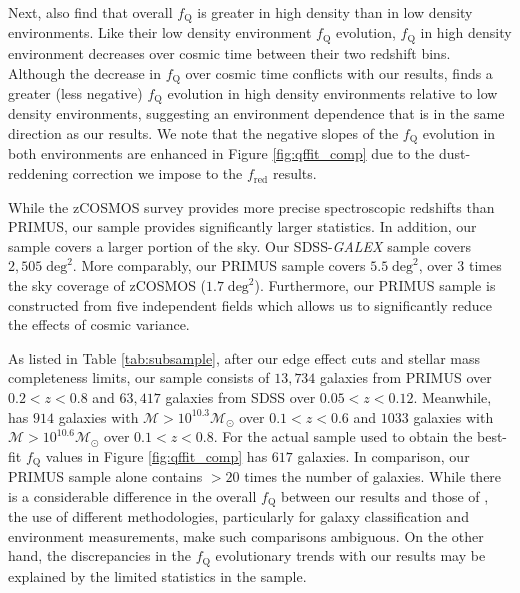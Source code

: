 \documentclass{aastex}
\begin{document}
Next, \cite{Kovac:2014aa} also find that overall $f_{\mathrm{Q}}$ is
greater in high density than in low density environments. Like their
low density environment $f_{\mathrm{Q}}$ evolution, $f_{\mathrm{Q}}$ in high
density environment decreases over cosmic time between their two
redshift bins. Although the decrease in $f_{\mathrm{Q}}$ over cosmic time
conflicts with our results, \cite{Kovac:2014aa} finds a greater (less
negative) $f_{\mathrm{Q}}$ evolution in high density environments relative
to low density environments, suggesting an environment dependence that
is in the same direction as our results. We note that the negative
slopes of the $f_{\mathrm{Q}}$ evolution in both environments are enhanced
in Figure \ref{fig:qffit_comp} due to the dust-reddening
correction we impose to the \cite{Kovac:2014aa} $f_{\mathrm{red}}$ results. 


While the zCOSMOS survey provides more precise spectroscopic redshifts than PRIMUS, our sample provides significantly larger statistics. In addition, our sample covers a larger portion of the sky. Our SDSS-{\em GALEX} sample covers $2,505 \;\mathrm{deg}^2$. More comparably, our PRIMUS sample covers $5.5 \;\mathrm{deg}^2$, over 3 times the sky coverage of zCOSMOS ($1.7 \;\mathrm{deg}^2$). Furthermore, our PRIMUS sample is constructed from five independent fields which allows us to significantly reduce the effects of cosmic variance. 

As listed in Table \ref{tab:subsample}, after our edge effect cuts and
stellar mass completeness limits, our sample consists of $13,734$
galaxies from PRIMUS over $0.2< z< 0.8$ and $63,417$ galaxies from
SDSS over $0.05 < z < 0.12$. Meanwhile, \cite{Iovino:2010aa} has $914$
galaxies with $\mathcal{M} > 10^{10.3} \mathcal{M}_{\odot}$ over $0.1
< z < 0.6$ and $1033$ galaxies with $\mathcal{M} > 10^{10.6}
\mathcal{M}_{\odot}$ over $0.1 < z < 0.8$. For the actual sample used
to obtain the best-fit $f_{\mathrm{Q}}$ values in Figure
\ref{fig:qffit_comp} \cite{Iovino:2010aa} has $617$ galaxies. In
comparison, our PRIMUS sample alone contains $> 20$ times the number
of galaxies. While there is a considerable difference in the overall
$f_{\mathrm{Q}}$ between our results and those of \cite{Iovino:2010aa},
the use of different methodologies, particularly for galaxy
classification and environment measurements, make such comparisons
ambiguous. On the other hand, the discrepancies in the $f_{\mathrm{Q}}$
evolutionary trends with our results may be explained by the limited
statistics in the \cite{Iovino:2010aa} sample.
\end{document}
